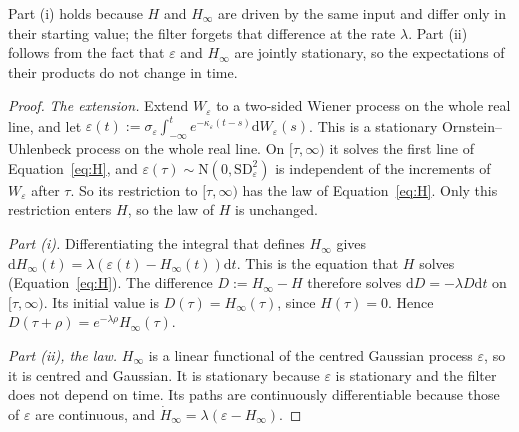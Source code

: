 \documentclass[a4paper,11pt]{article}
\theoremstyle{definition}
\newcommand{\dd}{\mathrm d}
\newcommand{\1}{\mathbbm{1}}
\begin{document}
Part (i) holds because $H$ and $H_{\infty}$ are driven by the same input and differ only in their starting value; the filter forgets that difference at the rate $\lambda$. Part (ii) follows from the fact that $\varepsilon$ and $H_{\infty}$ are jointly stationary, so the expectations of their products do not change in time.

\begin{proof}
\emph{The extension.} Extend $W_{\varepsilon}$ to a two-sided Wiener process on the whole real line, and let $\varepsilon(t):=\sigma_{\varepsilon}\int_{-\infty}^{t}e^{-\kappa_{\varepsilon}(t-s)}\dd W_{\varepsilon}(s)$. This is a stationary Ornstein--Uhlenbeck process on the whole real line. On $[\tau,\infty)$ it solves the first line of Equation~\eqref{eq:H}, and $\varepsilon(\tau)\sim\mathrm{N}\left(0,\mathrm{SD}_{\varepsilon}^{2}\right)$ is independent of the increments of $W_{\varepsilon}$ after $\tau$. So its restriction to $[\tau,\infty)$ has the law of Equation~\eqref{eq:H}. Only this restriction enters $H$, so the law of $H$ is unchanged.

\emph{Part (i).} Differentiating the integral that defines $H_{\infty}$ gives $\dd H_{\infty}(t)=\lambda\left(\varepsilon(t)-H_{\infty}(t)\right)\dd t$. This is the equation that $H$ solves (Equation~\eqref{eq:H}). The difference $D:=H_{\infty}-H$ therefore solves $\dd D=-\lambda D\dd t$ on $[\tau,\infty)$. Its initial value is $D(\tau)=H_{\infty}(\tau)$, since $H(\tau)=0$. Hence $D(\tau+\rho)=e^{-\lambda\rho}H_{\infty}(\tau)$.

\emph{Part (ii), the law.} $H_{\infty}$ is a linear functional of the centred Gaussian process $\varepsilon$, so it is centred and Gaussian. It is stationary because $\varepsilon$ is stationary and the filter does not depend on time. Its paths are continuously differentiable because those of $\varepsilon$ are continuous, and $\dot{H}_{\infty}=\lambda(\varepsilon-H_{\infty})$.


\end{proof}
\end{document}
